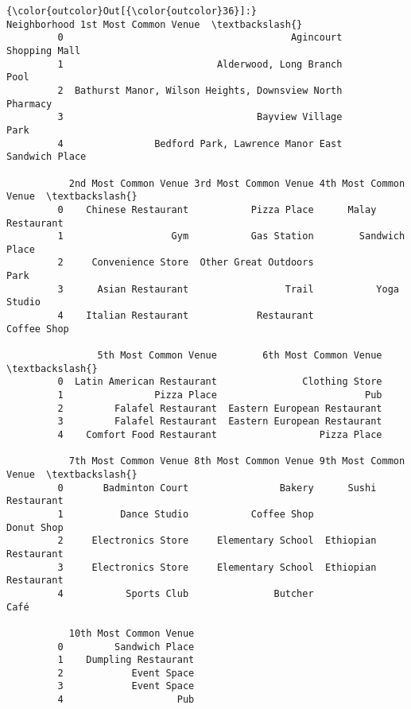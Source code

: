 \documentclass[11pt]{article}
\begin{document}
\begin{Verbatim}[commandchars=\\\{\}]
{\color{outcolor}Out[{\color{outcolor}36}]:}                                       Neighborhood 1st Most Common Venue  \textbackslash{}
         0                                        Agincourt         Shopping Mall   
         1                           Alderwood, Long Branch                  Pool   
         2  Bathurst Manor, Wilson Heights, Downsview North              Pharmacy   
         3                                  Bayview Village                  Park   
         4                Bedford Park, Lawrence Manor East        Sandwich Place   
         
           2nd Most Common Venue 3rd Most Common Venue 4th Most Common Venue  \textbackslash{}
         0    Chinese Restaurant           Pizza Place      Malay Restaurant   
         1                   Gym           Gas Station        Sandwich Place   
         2     Convenience Store  Other Great Outdoors                  Park   
         3      Asian Restaurant                 Trail           Yoga Studio   
         4    Italian Restaurant            Restaurant           Coffee Shop   
         
                5th Most Common Venue        6th Most Common Venue  \textbackslash{}
         0  Latin American Restaurant               Clothing Store   
         1                Pizza Place                          Pub   
         2         Falafel Restaurant  Eastern European Restaurant   
         3         Falafel Restaurant  Eastern European Restaurant   
         4    Comfort Food Restaurant                  Pizza Place   
         
           7th Most Common Venue 8th Most Common Venue 9th Most Common Venue  \textbackslash{}
         0       Badminton Court                Bakery      Sushi Restaurant   
         1          Dance Studio           Coffee Shop            Donut Shop   
         2     Electronics Store     Elementary School  Ethiopian Restaurant   
         3     Electronics Store     Elementary School  Ethiopian Restaurant   
         4           Sports Club               Butcher                  Café   
         
           10th Most Common Venue  
         0         Sandwich Place  
         1    Dumpling Restaurant  
         2            Event Space  
         3            Event Space  
         4                    Pub  
\end{Verbatim}
            
\end{document}
